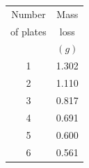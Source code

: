 \begin{longtable}{cc}
\toprule
Number	& Mass	\\
of plates	& loss	\\
	& $(g)$	\\
1	& 1.302	\\
2	& 1.110	\\
3	& 0.817	\\
4	& 0.691	\\
5	& 0.600	\\
6	& 0.561	\\

\bottomrule
\end{longtable}
